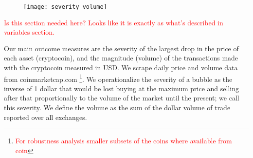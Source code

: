 \begin{figure}
\texttt{[image: severity\_volume]}
\end{figure}
\textcolor{red}{Is this section needed here? Looks like it is exactly as what's described in variables section.}

Our main outcome measures are the severity of the largest drop in the price of each asset (cryptocoin), and the magnitude (volume) of the transactions made with the cryptocoin measured in USD.
We scrape daily price and volume data from coinmarketcap.com \footnote{\textcolor{red}{For robustness analysis smaller subsets of the coins where available from coin}}.
We operationalize the severity of a bubble as the inverse of 1 dollar that would be lost buying at the maximum price and selling after that proportionally to the volume of the market until the present; we call this severity.
We define the volume as the sum of the dollar volume of trade reported over all exchanges.
